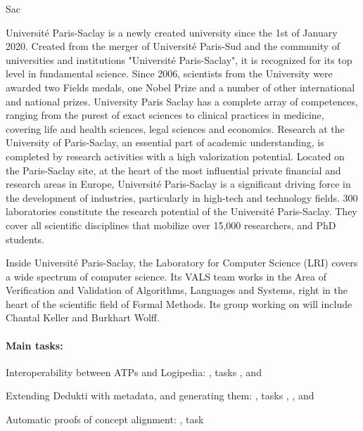 \begin{sitedescription}{Sac}


Université Paris-Saclay is a newly created university since the 1st of
January 2020. Created from the merger of Université Paris-Sud and the
community of universities and institutions "Université Paris-Saclay", it
is recognized for its top level in fundamental science.  Since 2006,
scientists from the University were awarded two Fields medals, one Nobel
Prize and a number of other international and national prizes.
University Paris Saclay has a complete array of competences, ranging
from the purest of exact sciences to clinical practices in medicine,
covering life and health sciences, legal sciences and economics.
Research at the University of Paris-Saclay, an essential part of
academic understanding, is completed by research activities with a high
valorization potential. Located on the Paris-Saclay site, at the heart
of the most influential private financial and research areas in Europe,
Université Paris-Saclay is a significant driving force in the
development of industries, particularly in high-tech and technology
fields. 300 laboratories constitute the research potential of the
Université Paris-Saclay. They cover all scientific disciplines that
mobilize over 15,000 researchers, and PhD students.

Inside Université Paris-Saclay, the Laboratory for Computer Science
(LRI) covers a wide spectrum of computer science. Its VALS team works in
the Area of Verification and Validation of Algorithms, Languages and
Systems, right in the heart of the scientific field of Formal Methods.
Its group working on \pn will include Chantal Keller and Burkhart Wolff.

\paragraph*{Main tasks:}

\begin{compactitem}
\item Interoperability between ATPs and Logipedia: , tasks
  ,  and
\item Extending Dedukti with metadata, and generating them:
  , tasks ,
  ,  and
\item Automatic proofs of concept alignment: , task
\end{compactitem}


\end{sitedescription}
